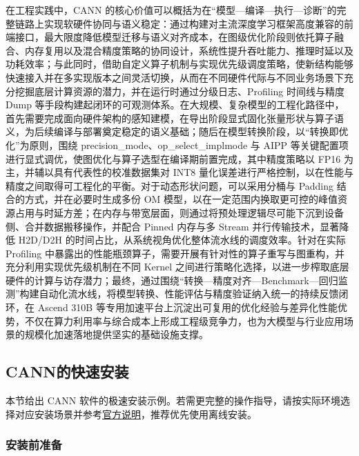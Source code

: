 在工程实践中，CANN
的核心价值可以概括为在``模型---编译---执行---诊断''的完整链路上实现软硬件协同与语义稳定：通过构建对主流深度学习框架高度兼容的前端接口，最大限度降低模型迁移与语义对齐成本，在图级优化阶段则依托算子融合、内存复用以及混合精度策略的协同设计，系统性提升吞吐能力、推理时延以及功耗效率；与此同时，借助自定义算子机制与实现优先级调度策略，使新结构能够快速接入并在多实现版本之间灵活切换，从而在不同硬件代际与不同业务场景下充分挖掘底层计算资源的潜力，并在运行时通过分级日志、Profiling
时间线与精度 Dump
等手段构建起闭环的可观测体系。在大规模、复杂模型的工程化路径中，首先需要完成面向硬件架构的感知建模，在导出阶段显式固化张量形状与算子语义，为后续编译与部署奠定稳定的语义基础；随后在模型转换阶段，以``转换即优化''为原则，围绕
precision\_mode、op\_select\_implmode 与 AIPP
等关键配置项进行显式调优，使图优化与算子选型在编译期前置完成，其中精度策略以
FP16 为主，并辅以具有代表性的校准数据集对 INT8
量化误差进行严格控制，以在性能与精度之间取得可工程化的平衡。对于动态形状问题，可以采用分桶与
Padding 结合的方式，并在必要时生成多份 OM
模型，以在一定范围内换取更可控的峰值资源占用与时延方差；在内存与带宽层面，则通过将预处理逻辑尽可能下沉到设备侧、合并数据搬移操作，并配合
Pinned 内存与多 Stream 并行传输技术，显著降低 H2D/D2H
的时间占比，从系统视角优化整体流水线的调度效率。针对在实际 Profiling
中暴露出的性能瓶颈算子，需要开展有针对性的算子重写与图重构，并充分利用实现优先级机制在不同
Kernel
之间进行策略化选择，以进一步榨取底层硬件的计算与访存潜力；最终，通过围绕``转换---精度对齐---Benchmark---回归监测''构建自动化流水线，将模型转换、性能评估与精度验证纳入统一的持续反馈闭环，在
Ascend 310B
等专用加速平台上沉淀出可复用的优化经验与差异化性能优势，不仅在算力利用率与综合成本上形成工程级竞争力，也为大模型与行业应用场景的规模化加速落地提供坚实的基础设施支撑。

\subsection{CANN的快速安装}\label{src-book-chapter2-h5}

本节给出 CANN
软件的极速安装示例。若需更完整的操作指导，请按实际环境选择对应安装场景并参考\href{https://www.hiascend.com/document/detail/zh/CANNCommunityEdition/83RC1/index/index.html}{官方说明}，推荐优先使用离线安装。

\subsubsection{安装前准备}\label{src-book-chapter2-h6}

